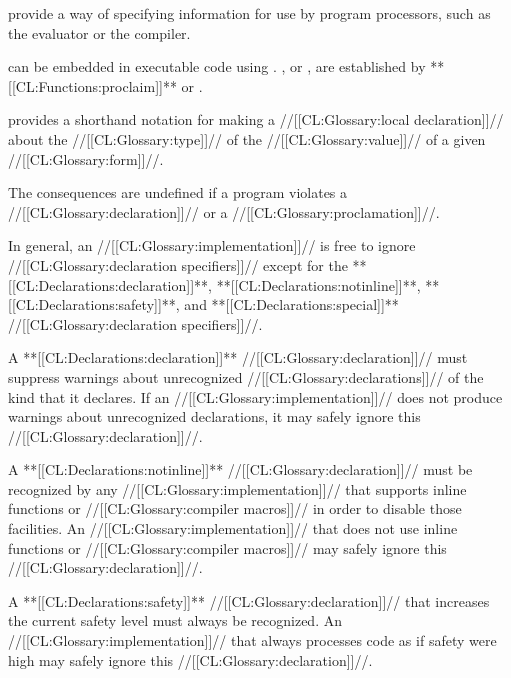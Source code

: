 

 provide a way of specifying information for use by program processors, such as the evaluator or the compiler.

 can be embedded in executable code using . ,  or , are established by **[[CL:Functions:proclaim]]** or .

 provides a shorthand notation for  making a //[[CL:Glossary:local declaration]]// about the //[[CL:Glossary:type]]// of the //[[CL:Glossary:value]]// of a given //[[CL:Glossary:form]]//.

The consequences are undefined if a program violates a //[[CL:Glossary:declaration]]// or a //[[CL:Glossary:proclamation]]//.


In general, an //[[CL:Glossary:implementation]]// is free to ignore //[[CL:Glossary:declaration specifiers]]// except for the
     **[[CL:Declarations:declaration]]**,
     **[[CL:Declarations:notinline]]**,
     **[[CL:Declarations:safety]]**,
 and **[[CL:Declarations:special]]** //[[CL:Glossary:declaration specifiers]]//.

A **[[CL:Declarations:declaration]]** //[[CL:Glossary:declaration]]// must suppress warnings about unrecognized //[[CL:Glossary:declarations]]// of the kind that it declares. If an //[[CL:Glossary:implementation]]// does not produce warnings about unrecognized declarations, it may safely ignore this //[[CL:Glossary:declaration]]//.

A **[[CL:Declarations:notinline]]** //[[CL:Glossary:declaration]]// must be recognized by any //[[CL:Glossary:implementation]]// that supports inline functions or //[[CL:Glossary:compiler macros]]// in order to disable those facilities. An //[[CL:Glossary:implementation]]// that does not use inline functions or //[[CL:Glossary:compiler macros]]// may safely ignore this //[[CL:Glossary:declaration]]//.

A **[[CL:Declarations:safety]]** //[[CL:Glossary:declaration]]// that increases the current safety level  must always be recognized.  An //[[CL:Glossary:implementation]]// that always processes  code as if safety were high may safely ignore this //[[CL:Glossary:declaration]]//.

